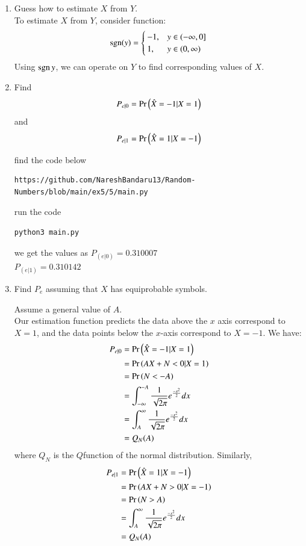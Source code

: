 \documentclass[journal,12pt,twocolumn]{IEEEtran}
\renewcommand\thesection{\arabic{section}}
\begin{document}
\begin{enumerate}[label=\thesection.\arabic*
,ref=\thesection.\theenumi]
\item Guess how to estimate $X$ from $Y$.\\
\solution To estimate $X$ from $Y$, consider function:
\begin{align}
    \mathop{\mathrm{sgn}}(y) = 
    \begin{cases}
        -1, & y \in (-\infty,0] \\
        1, & y \in (0, \infty)
    \end{cases}
\end{align}
Using $\mathop{\mathrm{sgn}}{y}$, we can operate on $Y$ to find corresponding values of $X$.

\item
\label{ml-ch4_sim}
Find 
\begin{equation}
	P_{e|0} = \Pr\left(\hat{X} = -1|X=1\right)
\end{equation}
and 
\begin{equation}
	P_{e|1} = \Pr\left(\hat{X} = 1|X=-1\right)
\end{equation}

find the code below
\begin{lstlisting}
https://github.com/NareshBandaru13/Random-Numbers/blob/main/ex5/5/main.py
\end{lstlisting}
run the code
\begin{lstlisting}
python3 main.py
\end{lstlisting}
we get the values as 
$P_{(e|0)} = 0.310007$ \\
$P_{(e|1)} = 0.310142$ \\

\item Find $P_e$ assuming that $X$ has equiprobable symbols.

\solution
Assume a general value of $A$.\\
 Our estimation function predicts  the data above the $x$ axis correspond to $X=1$, and the data points below the $x$-axis correspond to $X=-1$.
We have:
\begin{align*}
    P_{e|0} &= \Pr\left(\hat{X} = -1|X=1\right) \\
    &= \Pr\left(AX+N<0|X=1\right) \\
    &= \Pr\left(N<-A\right) \\
    &= \int_{-\infty} ^{-A} \frac{1}{\sqrt{2\pi}} e^{\frac{-x^2}{2}} dx \\
    &= \int_{A} ^{\infty} \frac{1}{\sqrt{2\pi}} e^{\frac{-x^2}{2}} dx \\
    &= Q_N(A)
\end{align*}
where $Q_N$ is the $Q$function of the normal distribution.
Similarly, 
\begin{align*}
    P_{e|1} &= \Pr\left(\hat{X} = 1|X=-1\right) \\
    &= \Pr\left(AX+N>0|X=-1\right) \\
    &= \Pr\left(N>A\right) \\
    &= \int_{A} ^{\infty} \frac{1}{\sqrt{2\pi}} e^{\frac{-x^2}{2}} dx \\
    &= Q_N(A)
\end{align*}


\end{enumerate}
\end{document}
